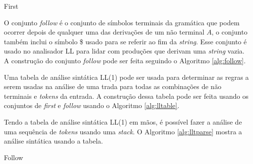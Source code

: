 \begin{algorithm}[htp]
    \caption{First}\label{alg:first}
\end{algorithm}

O conjunto \textit{follow} é o conjunto de símbolos terminais da gramática que podem ocorrer depois de qualquer uma das derivações de um não terminal $A$, o conjunto também inclui o símbolo \$ usado para se referir ao fim da \textit{string}. Esse conjunto é usado no analisador LL para lidar com produções que derivam uma \textit{string} vazia. A construção do conjunto \textit{follow} pode ser feita seguindo o Algoritmo \ref{alg:follow}.

Uma tabela de análise sintática LL(1) pode ser usada para determinar as regras a serem usadas na análise de uma trada para todas as combinações de não terminais e \textit{tokens} da entrada. A construção dessa tabela pode ser feita usando os conjuntos de \textit{first} e \textit{follow} usando o Algoritmo \ref{alg:lltable}.

Tendo a tabela de análise sintática LL(1) em mãos, é possível fazer a análise de uma sequência de \textit{tokens} usando uma \textit{stack}. O Algoritmo \ref{alg:lltparse} mostra a análise sintática usando a tabela. 

\begin{algorithm}[htp]
    \caption{Follow}\label{alg:follow}
\end{algorithm}

